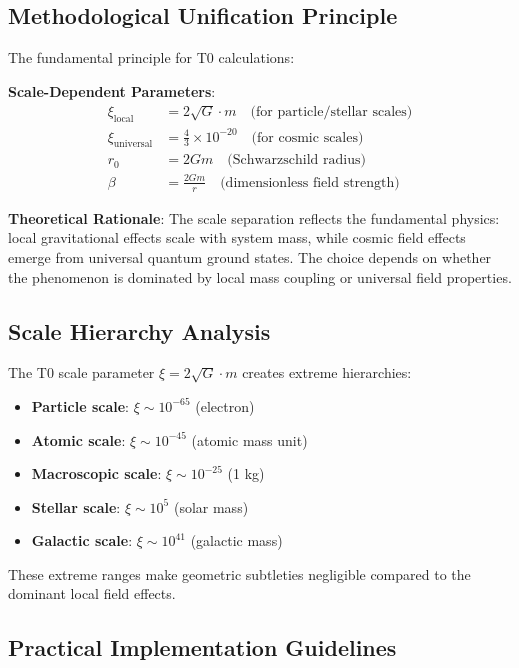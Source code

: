 \documentclass[12pt,a4paper]{article}
\begin{document}
	\subsection{Methodological Unification Principle}
	\label{subsec:methodological_unification}
	
	The fundamental principle for T0 calculations:
	
	\textbf{Scale-Dependent Parameters}:
	\begin{align}
		\xi_{\text{local}} &= 2\sqrt{G} \cdot m \quad \text{(for particle/stellar scales)} \\
		\xi_{\text{universal}} &= \frac{4}{3} \times 10^{-20} \quad \text{(for cosmic scales)} \\
		r_0 &= 2Gm \quad \text{(Schwarzschild radius)} \\
		\beta &= \frac{2Gm}{r} \quad \text{(dimensionless field strength)}
	\end{align}
	
	\textbf{Theoretical Rationale}: The scale separation reflects the fundamental physics: local gravitational effects scale with system mass, while cosmic field effects emerge from universal quantum ground states. The choice depends on whether the phenomenon is dominated by local mass coupling or universal field properties.
	
	\subsection{Scale Hierarchy Analysis}
	\label{subsec:scale_hierarchy}
	
	The T0 scale parameter $\xi = 2\sqrt{G} \cdot m$ creates extreme hierarchies:
	
	\begin{itemize}
		\item \textbf{Particle scale}: $\xi \sim 10^{-65}$ (electron)
		\item \textbf{Atomic scale}: $\xi \sim 10^{-45}$ (atomic mass unit)
		\item \textbf{Macroscopic scale}: $\xi \sim 10^{-25}$ (1 kg)
		\item \textbf{Stellar scale}: $\xi \sim 10^{5}$ (solar mass)
		\item \textbf{Galactic scale}: $\xi \sim 10^{41}$ (galactic mass)
	\end{itemize}
	
	These extreme ranges make geometric subtleties negligible compared to the dominant local field effects.
	
	\subsection{Practical Implementation Guidelines}
	\label{subsec:implementation_guidelines}
	
\end{document}
